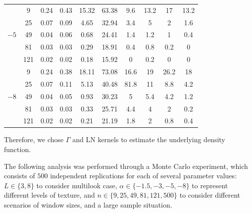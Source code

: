 \documentclass[twocolumn]{svjour3}
\begin{document}
\begin{table}[hbt]
\begin{tabular}{cc S[table-format=0.1]S[table-format=0.1]S[table-format=0.1] S[table-format=0.1] @{\hskip 8mm} S[table-format=0.2]S[table-format=0.1]S[table-format=0.1]S[table-format=0.1]}
		\midrule                                        
		&  9       &       0.24     &     0.43     &     15.32     &     63.38     &    9.6    &    13.2    &   17         &    13.2 \\                    
		&  25      &       0.07     &     0.09     &     4.65      &     32.94     &    3.4    &   5        &    2         &    1.6 \\                    
		&  49      &       0.04     &     0.06     &     0.68      &     24.41     &    1.4    &    1.2     &    1         &    0.4 \\
		&  81      &       0.03     &     0.03     &     0.29      &     18.91     &    0.4    &    0.8     &    0.2       &    0 \\
		&  121     &       0.02     &     0.02     &     0.18      &     15.92     &    0      &    0.2     &    0         &    0 \\
		
		\midrule                                        
		&  9       &       0.24     &     0.38     &     18.11     &     73.08     &    16.6    &    19     & 26.2         &    18 \\                
		&  25      &       0.07     &     0.11     &     5.13      &     40.48     &    81.8    &   11      &    8.8       &    4.2 \\            
		&  49      &       0.04     &     0.05     &     0.93      &     30.23     &    5       &    5.4    &    4.2       &    1.2 \\    
		&  81      &       0.03     &     0.03     &     0.33      &     25.71     &    4.4     &    4      &    2         &    0.2 \\    
		&  121     &       0.02     &     0.02     &     0.21      &     21.19     &    1.8     &    2      &    0.8       &    0.4 \\
		\bottomrule
	\end{tabular}                                              
\end{table}    

Therefore, we chose $\Gamma$ and LN kernels to estimate the underlying density function.

The following analysis was performed through a Monte Carlo experiment, which consists of $500$ independent replications for each of several parameter values: 
$L\in\{3,8\}$ to consider multilook case,
$\alpha\in\{-1.5, -3, -5, -8\}$ to represent different levels of texture, 
and 
$n\in\{9, 25,49, 81,121,500\}$ to consider different scenarios of window sizes, and a large sample situation.
\end{document}
